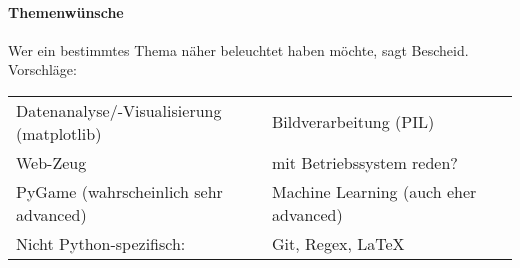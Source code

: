 \documentclass{article}
\begin{document}
\paragraph{Themenwünsche}
	Wer ein bestimmtes Thema näher beleuchtet haben möchte, sagt Bescheid. Vorschläge: \\
	\begin{tabular}{ll}
		Datenanalyse/-Visualisierung (matplotlib) &
		Bildverarbeitung (PIL) \\
		Web-Zeug &
		mit Betriebssystem reden? \\
		PyGame (wahrscheinlich sehr advanced) &
		Machine Learning (auch eher advanced) \\
		Nicht Python-spezifisch: & Git, Regex, \LaTeX
	\end{tabular}
\end{document}
